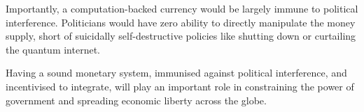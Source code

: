 Importantly, a computation-backed currency would be largely immune to political interference. Politicians would have zero ability to directly manipulate the money supply, short of suicidally self-destructive policies like shutting down or curtailing the quantum internet.

Having a sound monetary system, immunised against political interference, and incentivised to integrate, will play an important role in constraining the power of government and spreading economic liberty across the globe.